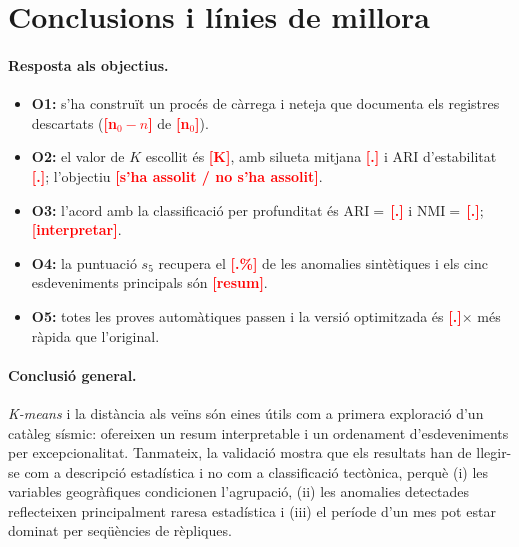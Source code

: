 \documentclass[11pt,a4paper]{article}
\newcommand{\pend}[1]{\textcolor{red}{\textbf{[#1]}}}
\begin{document}
\section{Conclusions i línies de millora}\label{sec:conclusions}
\paragraph{Resposta als objectius.}
\begin{itemize}[nosep]
  \item \textbf{O1:} s'ha construït un procés de càrrega i neteja que
        documenta els registres descartats (\pend{n$_0-n$} de \pend{n$_0$}).
  \item \textbf{O2:} el valor de $K$ escollit és \pend{K}, amb silueta mitjana
        \pend{.} i ARI d'estabilitat \pend{.}; l'objectiu \pend{s'ha assolit /
        no s'ha assolit}.
  \item \textbf{O3:} l'acord amb la classificació per profunditat és
        $\mathrm{ARI}=\,$\pend{.} i $\mathrm{NMI}=\,$\pend{.}; \pend{interpretar}.
  \item \textbf{O4:} la puntuació $s_5$ recupera el \pend{.\%} de les anomalies
        sintètiques i els cinc esdeveniments principals són
        \pend{resum}.
  \item \textbf{O5:} totes les proves automàtiques passen i la versió
        optimitzada és \pend{.}$\times$ més ràpida que l'original.
\end{itemize}

\paragraph{Conclusió general.} \textit{K-means} i la distància als veïns són
eines útils com a primera exploració d'un catàleg sísmic: ofereixen un resum
interpretable i un ordenament d'esdeveniments per excepcionalitat. Tanmateix,
la validació mostra que els resultats han de llegir-se com a descripció
estadística i no com a classificació tectònica, perquè (i) les variables
geogràfiques condicionen l'agrupació, (ii) les anomalies detectades reflecteixen
principalment raresa estadística i (iii) el període d'un mes pot estar dominat
per seqüències de rèpliques.
\end{document}
